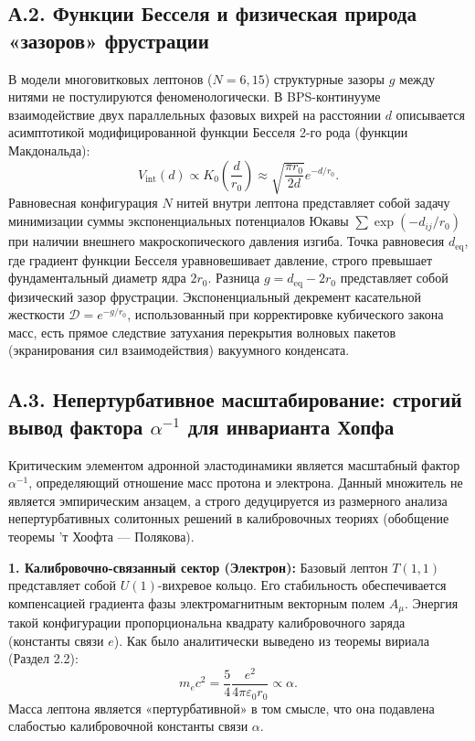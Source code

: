 \documentclass[11pt,a4paper]{article}
\begin{document}
\subsection*{А.2. Функции Бесселя и физическая природа «зазоров» фрустрации}
В модели многовитковых лептонов ($N=6, 15$) структурные зазоры $g$ между нитями не постулируются феноменологически. В BPS-континууме взаимодействие двух параллельных фазовых вихрей на расстоянии $d$ описывается асимптотикой модифицированной функции Бесселя 2-го рода (функции Макдональда):
\begin{equation}
V_{\text{int}}(d) \propto K_0\left(\frac{d}{r_0}\right) \approx \sqrt{\frac{\pi r_0}{2d}} e^{-d/r_0}.
\end{equation}
Равновесная конфигурация $N$ нитей внутри лептона представляет собой задачу минимизации суммы экспоненциальных потенциалов Юкавы $\sum \exp(-d_{ij}/r_0)$ при наличии внешнего макроскопического давления изгиба. Точка равновесия $d_{\text{eq}}$, где градиент функции Бесселя уравновешивает давление, строго превышает фундаментальный диаметр ядра $2r_0$. 
Разница $g = d_{\text{eq}} - 2r_0$ представляет собой физический зазор фрустрации. Экспоненциальный декремент касательной жесткости $\mathcal{D} = e^{-g/r_0}$, использованный при корректировке кубического закона масс, есть прямое следствие затухания перекрытия волновых пакетов (экранирования сил взаимодействия) вакуумного конденсата.

\subsection*{А.3. Непертурбативное масштабирование: строгий вывод фактора $\alpha^{-1}$ для инварианта Хопфа}

Критическим элементом адронной эластодинамики является масштабный фактор $\alpha^{-1}$, определяющий отношение масс протона и электрона. Данный множитель не является эмпирическим анзацем, а строго дедуцируется из размерного анализа непертурбативных солитонных решений в калибровочных теориях (обобщение теоремы ’т Хоофта — Полякова).

\textbf{1. Калибровочно-связанный сектор (Электрон):}
Базовый лептон $T(1,1)$ представляет собой $U(1)$-вихревое кольцо. Его стабильность обеспечивается компенсацией градиента фазы электромагнитным векторным полем $A_\mu$. Энергия такой конфигурации пропорциональна квадрату калибровочного заряда (константы связи $e$). Как было аналитически выведено из теоремы вириала (Раздел 2.2):
\begin{equation}
	m_e c^2 = \frac{5}{4} \frac{e^2}{4\pi\varepsilon_0 r_0} \propto \alpha.
	\label{eq:me_scaling}
\end{equation}
Масса лептона является «пертурбативной» в том смысле, что она подавлена слабостью калибровочной константы связи $\alpha$.
\end{document}

